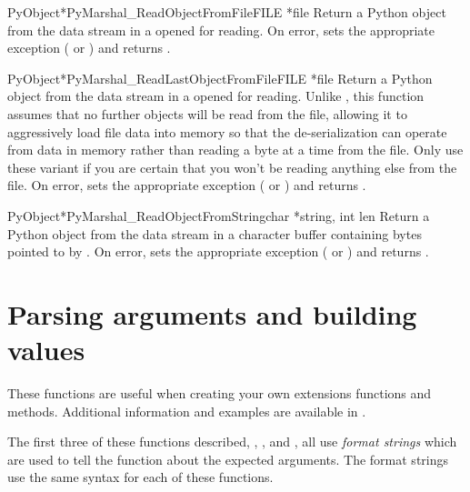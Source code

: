 \begin{cfuncdesc}{PyObject*}{PyMarshal_ReadObjectFromFile}{FILE *file}
  Return a Python object from the data stream in a 
  opened for reading.  On error, sets the appropriate exception
  ( or ) and returns \NULL.
\end{cfuncdesc}

\begin{cfuncdesc}{PyObject*}{PyMarshal_ReadLastObjectFromFile}{FILE *file}
  Return a Python object from the data stream in a 
  opened for reading.  Unlike
  , this function assumes
  that no further objects will be read from the file, allowing it to
  aggressively load file data into memory so that the de-serialization
  can operate from data in memory rather than reading a byte at a time
  from the file.  Only use these variant if you are certain that you
  won't be reading anything else from the file.  On error, sets the
  appropriate exception ( or
  ) and returns \NULL.
\end{cfuncdesc}

\begin{cfuncdesc}{PyObject*}{PyMarshal_ReadObjectFromString}{char *string,
                                                             int len}
  Return a Python object from the data stream in a character buffer
  containing  bytes pointed to by .  On error,
  sets the appropriate exception ( or
  ) and returns \NULL.
\end{cfuncdesc}


\section{Parsing arguments and building values
         \label{arg-parsing}}

These functions are useful when creating your own extensions functions
and methods.  Additional information and examples are available in
.

The first three of these functions described,
,
, and
, all use \emph{format strings} which are
used to tell the function about the expected arguments.  The format
strings use the same syntax for each of these functions.

